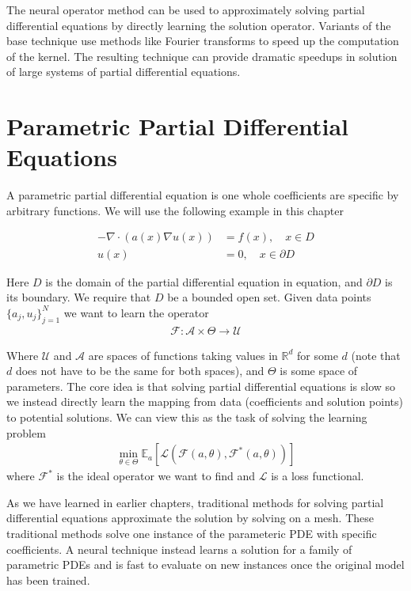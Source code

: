 \documentclass[book.tex]{subfiles}
\begin{document}
The neural operator method can be used to approximately solving partial differential equations by directly learning the solution operator. Variants of the base technique use methods like Fourier transforms to speed up the computation of the kernel. The resulting technique can provide dramatic speedups in solution of large systems of partial differential equations.

\section{Parametric Partial Differential Equations}

A parametric partial differential equation is one whole coefficients are specific by arbitrary functions. We will use the following example in this chapter

\begin{align}
    - \nabla \cdot (a(x) \nabla u(x)) &= f(x),\quad  x \in D \\
    u(x) &= 0,\quad  x \in \partial D
\end{align}



Here $D$ is the domain of the partial differential equation in equation, and $\partial D$ is its boundary. We require that $D$ be a bounded open set. Given data points $\{a_j, u_j\}_{j=1}^{N}$ we want to learn the operator 
\begin{align}
\mathcal{F}: \mathcal{A} \times \Theta \to \mathcal{U}
\end{align}

Where $\mathcal{U}$ and $\mathcal{A}$ are spaces of functions taking values in $\mathbb{R}^d$ for some $d$ (note that $d$ does not have to be the same for both spaces), and $\Theta$ is some space of parameters. The core idea is that solving partial differential equations is slow so we instead directly learn the mapping from data (coefficients and solution points) to potential solutions. We can view this as the task of solving the learning problem
\begin{align}
\min_{\theta \in \Theta} \mathbb{E}_a[\mathcal{L}(\mathcal{F}(a, \theta), \mathcal{F}^*(a, \theta))]
\end{align}
where $\mathcal{F}^*$ is the ideal operator we want to find and $\mathcal{L}$ is a loss functional.

As we have learned in earlier chapters, traditional methods for solving partial differential equations approximate the solution by solving on a mesh. These traditional methods solve one instance of the parameteric PDE with specific coefficients. A neural technique instead learns a solution for a family of parametric PDEs and is fast to evaluate on new instances once the original model has been trained.
\end{document}
